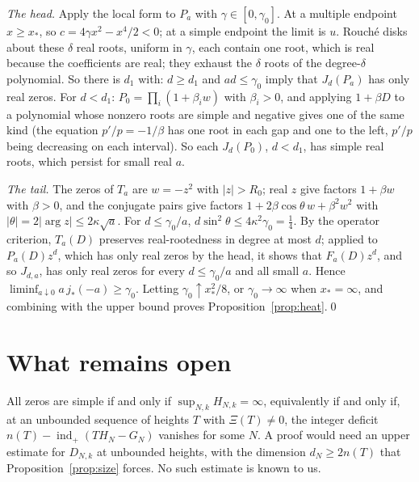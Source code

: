 \documentclass[11pt,a4paper]{article}
\theoremstyle{plain}
\theoremstyle{remark}
\DeclareMathOperator{\ind}{ind}
\begin{document}
\emph{The head.} Apply the local form to $P_a$ with $\gamma\in[0,\gamma_0]$. At a multiple endpoint $x\ge x_*$, so
$c=4\gamma x^2-x^4/2<0$; at a simple endpoint the limit is $u$. Rouch\'e disks about these $\delta$ real roots, uniform in
$\gamma$, each contain one root, which is real because the coefficients are real; they exhaust the $\delta$ roots of
the degree-$\delta$ polynomial. So there is $d_1$ with: $d\ge d_1$ and $ad\le\gamma_0$ imply that $J_d(P_a)$ has only real
zeros. For $d<d_1$: $P_0=\prod_i(1+\beta_iw)$ with $\beta_i>0$, and applying $1+\beta D$ to a polynomial whose nonzero roots
are simple and negative gives one of the same kind (the equation $p'/p=-1/\beta$ has one root in each gap and one to
the left, $p'/p$ being decreasing on each interval). So each $J_d(P_0)$, $d<d_1$, has simple real roots, which persist
for small real $a$.

\emph{The tail.} The zeros of $T_a$ are $w=-z^2$ with $|z|>R_0$; real $z$ give factors $1+\beta w$ with $\beta>0$, and
the conjugate pairs give factors $1+2\beta\cos\theta\,w+\beta^2w^2$ with $|\theta|=2|\arg z|\le2\kappa\sqrt a$. For
$d\le\gamma_0/a$, $d\sin^2\theta\le4\kappa^2\gamma_0=\frac14$. By the operator criterion, $T_a(D)$ preserves real-rootedness
in degree at most $d$; applied to $P_a(D)z^d$, which has only real zeros by the head, it shows that $F_a(D)z^d$, and so
$J_{d,a}$, has only real zeros for every $d\le\gamma_0/a$ and all small $a$. Hence
$\liminf_{a\downarrow0}a\,j_*(-a)\ge\gamma_0$. Letting $\gamma_0\uparrow x_*^2/8$, or $\gamma_0\to\infty$ when
$x_*=\infty$, and combining with the upper bound proves Proposition~\ref{prop:heat}.\qed

\section{What remains open}

All zeros are simple if and only if $\sup_{N,k}H_{N,k}=\infty$, equivalently if and only if, at an unbounded sequence
of heights $T$ with $\Xi(T)\ne0$, the integer deficit $n(T)-\ind_+(TH_N-G_N)$ vanishes for some $N$. A proof would need
an upper estimate for $D_{N,k}$ at unbounded heights, with the dimension $d_N\ge2n(T)$ that
Proposition~\ref{prop:size} forces. No such estimate is known to us.
\end{document}

